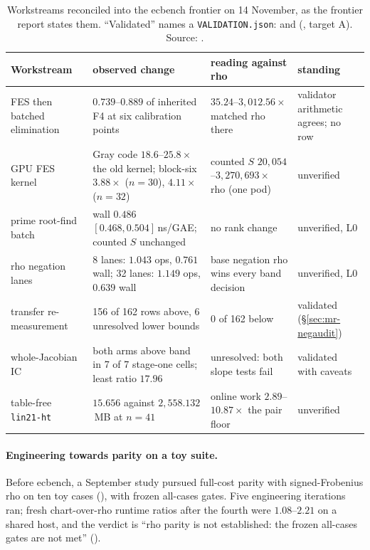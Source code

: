 \begin{table}[t]
\centering\footnotesize
\begin{tabularx}{\linewidth}{@{}>{\raggedright}p{2.7cm}>{\raggedright}X>{\raggedright}p{3.3cm}l@{}}
\toprule
Workstream & observed change & reading against rho & standing \\
\midrule
FES then batched elimination & $0.739$--$0.889$ of inherited F4 at six calibration points & $35.24$--$3{,}012.56\times$ matched rho there & validator arithmetic agrees; no row \\
GPU FES kernel & Gray code $18.6$--$25.8\times$ the old kernel; block-six $3.88\times$ ($n=30$), $4.11\times$ ($n=32$) & counted $S$ $20{,}054$--$3{,}270{,}693\times$ rho (one pod) & unverified \\
prime root-find batch & wall $0.486$ $[0.468,0.504]$\,ns/GAE; counted $S$ unchanged & no rank change & unverified, L0 \\
rho negation lanes & 8 lanes: $1.043$ ops, $0.761$ wall; 32 lanes: $1.149$ ops, $0.639$ wall & base negation rho wins every band decision & unverified, L0 \\
transfer re-measurement & 156 of 162 rows above, 6 unresolved lower bounds & 0 of 162 below & validated (\S\ref{sec:mr-negaudit}) \\
whole-Jacobian IC & both arms above band in 7 of 7 stage-one cells; least ratio $17.96$ & unresolved: both slope tests fail & validated with caveats \\
table-free \texttt{lin21-ht} & $15.656$ against $2{,}558.132$\,MB at $n=41$ & online work $2.89$--$10.87\times$ the pair floor & unverified \\
\bottomrule
\end{tabularx}
\caption[]{Workstreams reconciled into the ecbench frontier on 14 November,
as the frontier report states them. ``Validated'' names a
\texttt{VALIDATION.json}:  and
 (,
target A). Source:
.}
\label{tab:gf-recon}
\end{table}

\paragraph{Engineering towards parity on a toy suite.} Before ecbench, a
September study pursued full-cost parity with signed-Frobenius rho on ten
toy cases (), with frozen
all-cases gates. Five engineering iterations ran; fresh chart-over-rho
runtime ratios after the fourth were $1.08$--$2.21$ on a shared host, and
the verdict is ``rho parity is not established: the frozen all-cases gates
are not met'' ().

